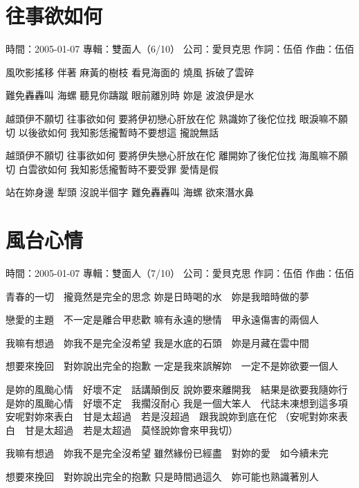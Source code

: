 \documentclass[UTF8,a4paper,oneside,twocolumn,12pt]{ctexbook}
\newcommand{\infopair}[2]{\textbullet #1：#2}
\newcommand{\zc}[1][伍佰]{\infopair{作詞}{#1}}
\newcommand{\zq}[1][伍佰]{\infopair{作曲}{#1}}
\newcommand{\zj}[1]{\infopair{專輯}{#1}}
\newcommand{\sj}[1]{\infopair{時間}{#1}}
\newcommand{\gs}[1]{\infopair{公司}{#1}}
\newenvironment{info}{\begin{flushleft}\kaishu
	}
	{\end{flushleft}\normalsize\yahei\par}
\newenvironment{lyric}{
	}
{}
\begin{document}
\section{往事欲如何}
\begin{info}
	\sj{2005-01-07}
	\zj{雙面人（6/10）}
	\gs{愛貝克思}
	\zc
	\zq
\end{info}
\begin{lyric}
	風吹影搖移 伴著 麻黃的樹枝
	看見海面的 燒風 拆破了雲碎

	難免轟轟叫 海螺 聽見你躊蹴
	眼前離別時 妳是 波浪伊是水

	越頭伊不願切 往事欲如何
	要將伊初戀心肝放在佗 熟識妳了後佗位找
	眼淚嘛不願切 以後欲如何
	我知影恁攏暫時不要想這 攏說無話

	越頭伊不願切 往事欲如何
	要將伊失戀心肝放在佗 離開妳了後佗位找
	海風嘛不願切 白雲欲如何
	我知影恁攏暫時不要受罪 愛情是假

	站在妳身邊 犁頭 沒說半個字
	難免轟轟叫 海螺 欲來潛水鼻
\end{lyric}

\section{風台心情}
\begin{info}
	\sj{2005-01-07}
	\zj{雙面人（7/10）}
	\gs{愛貝克思}
	\zc
	\zq
\end{info}
\begin{lyric}
	青春的一切　攏竟然是完全的思念
	妳是日時喝的水　妳是我暗時做的夢

	戀愛的主題　不一定是離合甲悲歡
	嘛有永遠的戀情　甲永遠傷害的兩個人

	我嘛有想過　妳我不是完全沒希望
	我是水底的石頭　妳是月藏在雲中間

	想要來挽回　對妳說出完全的抱歉
	一定是我來誤解妳　一定不是妳欲要一個人

	是妳的風颱心情　好壞不定　話講顛倒反
	說妳要來離開我　結果是欲要我隨妳行
	是妳的風颱心情　好壞不定　我擱沒耐心
	我是一個大笨人　代誌未凍想到這多項
	安呢對妳來表白　甘是太超過　若是沒超過　跟我說妳到底在佗
	（安呢對妳來表白　甘是太超過　若是太超過　莫怪說妳會來甲我切）

	我嘛有想過　妳我不是完全沒希望
	雖然緣份已經盡　對妳的愛　如今續未完

	想要來挽回　對妳說出完全的抱歉
	只是時間過這久　妳可能也熟識著別人
\end{lyric}
\end{document}
